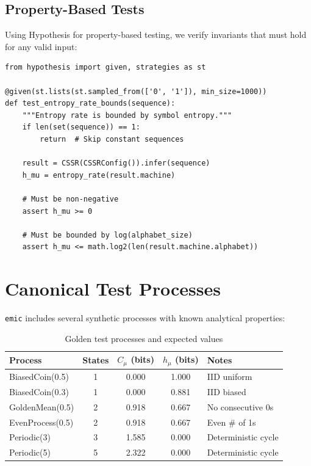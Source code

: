 \documentclass[11pt,a4paper]{report}
\theoremstyle{definition}
\theoremstyle{plain}
\newcommand{\Cmu}{C_\mu}
\newcommand{\hmu}{h_\mu}
\newcommand{\emic}{\texttt{emic}}
\begin{document}
\subsection{Property-Based Tests}

Using Hypothesis for property-based testing, we verify invariants that must hold for any valid input:

\begin{lstlisting}[caption={Property test example}]
from hypothesis import given, strategies as st

@given(st.lists(st.sampled_from(['0', '1']), min_size=1000))
def test_entropy_rate_bounds(sequence):
    """Entropy rate is bounded by symbol entropy."""
    if len(set(sequence)) == 1:
        return  # Skip constant sequences

    result = CSSR(CSSRConfig()).infer(sequence)
    h_mu = entropy_rate(result.machine)

    # Must be non-negative
    assert h_mu >= 0

    # Must be bounded by log(alphabet_size)
    assert h_mu <= math.log2(len(result.machine.alphabet))
\end{lstlisting}

\section{Canonical Test Processes}

\emic{} includes several synthetic processes with known analytical properties:

\begin{table}[h]
\centering
\caption{Golden test processes and expected values}
\label{tab:golden}
\begin{tabular}{lcccl}
\toprule
Process & States & $\Cmu$ (bits) & $\hmu$ (bits) & Notes \\
\midrule
BiasedCoin(0.5) & 1 & 0.000 & 1.000 & IID uniform \\
BiasedCoin(0.3) & 1 & 0.000 & 0.881 & IID biased \\
GoldenMean(0.5) & 2 & 0.918 & 0.667 & No consecutive 0s \\
EvenProcess(0.5) & 2 & 0.918 & 0.667 & Even \# of 1s \\
Periodic(3) & 3 & 1.585 & 0.000 & Deterministic cycle \\
Periodic(5) & 5 & 2.322 & 0.000 & Deterministic cycle \\
\bottomrule
\end{tabular}
\end{table}
\end{document}
